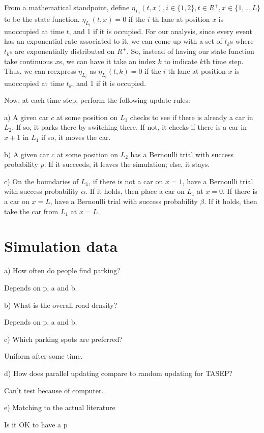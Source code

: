 \documentclass[]{article}
\begin{document}
From a mathematical standpoint, define $\eta_{L_i}(t, x), i \in \{1,2\}, t \in R^+, x \in \{1,..,L\}$ to be the state function.  
$\eta_{L_i}(t,x) = 0$ if the $i$ th lane at position $x$ is unoccupied at time $t$, and 1 if it is occupied. For our analysis, since every event has an exponential rate associated to it, we can come up with a set of $t_k$s where $t_k$s are exponentially distributed on $R^+$. So, instead of having our state function take continuous $x$s, we can have it take an index $k$ to indicate $k$th time step. Thus, we can reexpress $\eta_{L_i}$ as $\eta_{L_i}(t,k) = 0$ if the $i$ th lane at position $x$ is unoccupied at time $t_k$, and 1 if it is occupied.

Now, at each time step, perform the following update rules:

a) A given car $c$ at some position on $L_1$ checks to see if there is already a car in $L_2$. If so, it parks there by switching there. If not, it checks if there is a car in $x+1$ in $L_1$ if so, it moves the car.

b) A given car $c$ at some position on $L_2$ has a Bernoulli trial with success probability $p$. If it succeeds, it leaves the simulation; else, it stays.

c) On the boundaries of $L_1$, if there is not a car on $x = 1$, have a Bernoulli trial with success probability $\alpha$. If it holds, then place a car on $L_1$ at $x = 0$. If there is a car on $x = L$, have a Bernoulli trial with success probability $\beta$. If it holds, then take the car from $L_1$ at $x = L$.

\section*{Simulation data}

a) How often do people find parking?

Depends on p, a and b.

b) What is the overall road density?

Depends on p, a and b. 

c) Which parking spots are preferred? 

Uniform after some time. 

d) How does parallel updating compare to random updating for TASEP?

Can't test because of computer.

e) Matching to the actual literature


Is it OK to have a p
\end{document}
